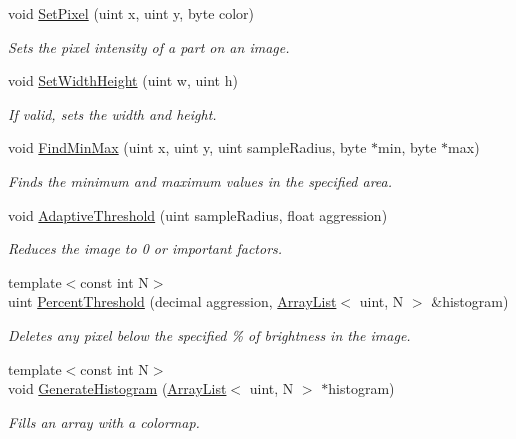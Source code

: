 \begin{DoxyCompactItemize}
void \hyperlink{classimage__processing_1_1Image_a8686d6979e34ca0afc35d3e0e241e8b6}{Set\+Pixel} (uint x, uint y, byte color)
\begin{DoxyCompactList}\small\item\em Sets the pixel intensity of a part on an image. \end{DoxyCompactList}\item 
void \hyperlink{classimage__processing_1_1Image_aa0f895ef02220e7b81af8cbb85f6a479}{Set\+Width\+Height} (uint w, uint h)
\begin{DoxyCompactList}\small\item\em If valid, sets the width and height. \end{DoxyCompactList}\item 
void \hyperlink{classimage__processing_1_1Image_a784ff8562f684f20b1b35a69c0c22b67}{Find\+Min\+Max} (uint x, uint y, uint sample\+Radius, byte $\ast$min, byte $\ast$max)
\begin{DoxyCompactList}\small\item\em Finds the minimum and maximum values in the specified area. \end{DoxyCompactList}\item 
void \hyperlink{classimage__processing_1_1Image_a7cc53155ea74b8480a0ca8fbfa698a65}{Adaptive\+Threshold} (uint sample\+Radius, float aggression)
\begin{DoxyCompactList}\small\item\em Reduces the image to 0 or important factors. \end{DoxyCompactList}\item 
{\footnotesize template$<$const int N$>$ }\\uint \hyperlink{classimage__processing_1_1Image_a705a802c9e2fef367b84debddd8cc826}{Percent\+Threshold} (decimal aggression, \hyperlink{classutil_1_1ArrayList}{Array\+List}$<$ uint, N $>$ \&histogram)
\begin{DoxyCompactList}\small\item\em Deletes any pixel below the specified \% of brightness in the image. \end{DoxyCompactList}\item 
{\footnotesize template$<$const int N$>$ }\\void \hyperlink{classimage__processing_1_1Image_a26e15daaaca99d18255688d14fb2a349}{Generate\+Histogram} (\hyperlink{classutil_1_1ArrayList}{Array\+List}$<$ uint, N $>$ $\ast$histogram)
\begin{DoxyCompactList}\small\item\em Fills an array with a colormap. \end{DoxyCompactList}\end{DoxyCompactItemize}


